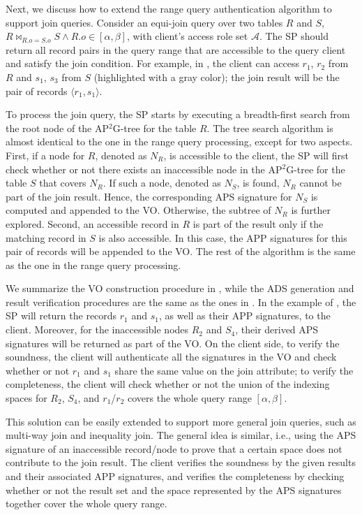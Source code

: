Next, we discuss how to extend the range query authentication algorithm to support join queries. Consider an equi-join query over two tables $R$ and $S$, $R \Join_{R.o = S.o} S \land R.o \in [\alpha, \beta]$, with client's access role set $\mathcal{A}$. The SP should return all record pairs in the query range that are accessible to the query client and satisfy the join condition.
For example, in , the client can access $r_1$, $r_2$ from $R$ and $s_1$, $s_3$ from $S$ (highlighted with a gray color); the join result will be the pair of records $\langle r_1, s_1\rangle$.

To process the join query, the SP starts by executing a breadth-first search from the root node of the AP$^2$G-tree for the table $R$. The tree search algorithm is almost identical to the one in the range query processing, except for two aspects. First, if a node for $R$, denoted as $N_R$, is accessible to the client, the SP will first check whether or not there exists an inaccessible node in the AP$^2$G-tree for the table $S$ that covers $N_R$. If such a node, denoted as $N_S$, is found, $N_R$ cannot be part of the join result. Hence, the corresponding APS signature for $N_S$ is computed and appended to the VO\@. Otherwise, the subtree of $N_R$ is further explored. Second, an accessible record in $R$ is part of the result only if the matching record in $S$ is also accessible. In this case, the APP signatures for this pair of records will be appended to the VO\@. The rest of the algorithm is the same as the one in the range query processing.

We summarize the VO construction procedure in , while the ADS generation and result verification procedures are the same as the ones in .
In the example of , the SP will return the records $r_1$ and $s_1$, as well as their APP signatures, to the client. Moreover, for the inaccessible nodes $R_2$ and $S_4$, their derived APS signatures will be returned as part of the VO\@. On the client side, to verify the soundness, the client will authenticate all the signatures in the VO and check whether or not $r_1$ and $s_1$ share the same value on the join attribute; to verify the completeness, the client will check whether or not the union of the indexing spaces for $R_2$, $S_4$, and $r_1$/$r_2$ covers the whole query range $[\alpha,\beta]$.

This solution can be easily extended to support more general join queries, such as multi-way join and inequality join. The general idea is similar, i.e., using the APS signature of an inaccessible record/node to prove that a certain space does not contribute to the join result. The client verifies the soundness by the given results and their associated APP signatures, and verifies the completeness by checking whether or not the result set and the space represented by the APS signatures together cover the whole query range.

